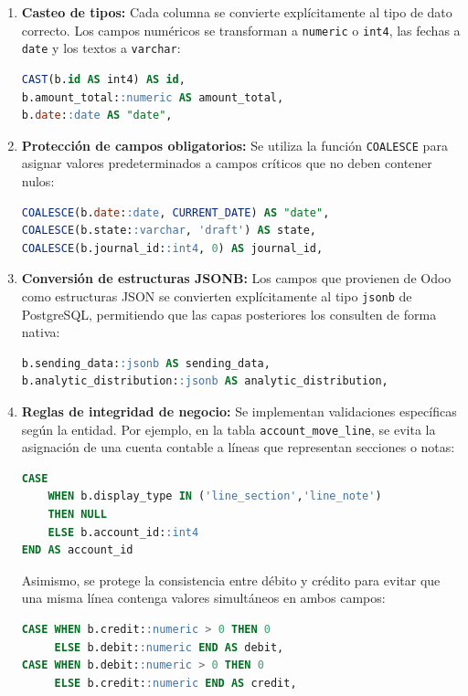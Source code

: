 \begin{enumerate}
    \item \textbf{Casteo de tipos:} Cada columna se convierte explícitamente al tipo de dato correcto. Los campos numéricos se transforman a \texttt{numeric} o \texttt{int4}, las fechas a \texttt{date} y los textos a \texttt{varchar}:
    \begin{lstlisting}[language=SQL, breaklines=true]
CAST(b.id AS int4) AS id,
b.amount_total::numeric AS amount_total,
b.date::date AS "date",
    \end{lstlisting}

    \item \textbf{Protección de campos obligatorios:} Se utiliza la función \texttt{COALESCE} para asignar valores predeterminados a campos críticos que no deben contener nulos:
    \begin{lstlisting}[language=SQL, breaklines=true]
COALESCE(b.date::date, CURRENT_DATE) AS "date",
COALESCE(b.state::varchar, 'draft') AS state,
COALESCE(b.journal_id::int4, 0) AS journal_id,
    \end{lstlisting}

    \item \textbf{Conversión de estructuras JSONB:} Los campos que provienen de Odoo como estructuras JSON se convierten explícitamente al tipo \texttt{jsonb} de PostgreSQL, permitiendo que las capas posteriores los consulten de forma nativa:
    \begin{lstlisting}[language=SQL, breaklines=true]
b.sending_data::jsonb AS sending_data,
b.analytic_distribution::jsonb AS analytic_distribution,
    \end{lstlisting}

    \item \textbf{Reglas de integridad de negocio:} Se implementan validaciones específicas según la entidad. Por ejemplo, en la tabla \texttt{account\_move\_line}, se evita la asignación de una cuenta contable a líneas que representan secciones o notas:
    \begin{lstlisting}[language=SQL, breaklines=true]
CASE
    WHEN b.display_type IN ('line_section','line_note')
    THEN NULL
    ELSE b.account_id::int4
END AS account_id
    \end{lstlisting}

    Asimismo, se protege la consistencia entre débito y crédito para evitar que una misma línea contenga valores simultáneos en ambos campos:
    \begin{lstlisting}[language=SQL, breaklines=true]
CASE WHEN b.credit::numeric > 0 THEN 0 
     ELSE b.debit::numeric END AS debit,
CASE WHEN b.debit::numeric > 0 THEN 0 
     ELSE b.credit::numeric END AS credit,
    \end{lstlisting}
\end{enumerate}

